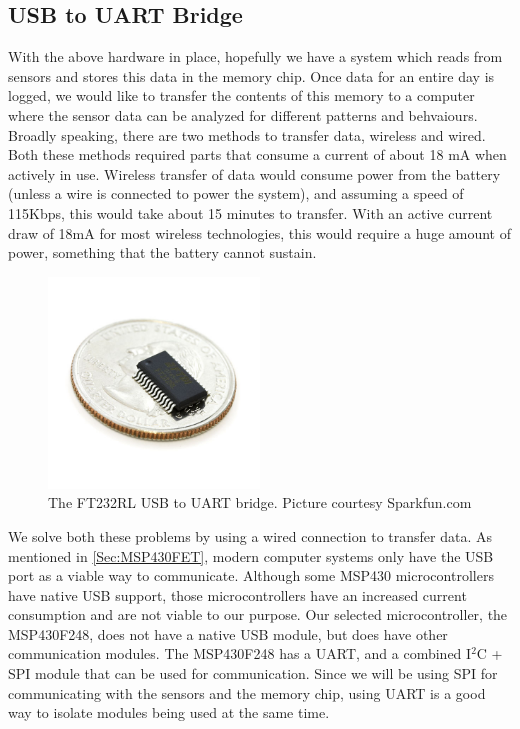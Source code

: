 \subsection{USB to UART Bridge}
\label{Sec:FT232}
With the above hardware in place, hopefully we have a system which reads from sensors and stores this data in the memory chip. Once data for an entire day is logged, we would like to transfer the contents of this memory to a computer where the sensor data can be analyzed for different patterns and behvaiours. Broadly speaking, there are two methods to transfer data, wireless and wired. Both these methods required parts that consume a current of about 18 mA when actively in use. Wireless transfer of data would consume power from the battery (unless a wire is connected to power the system), and assuming a speed of 115Kbps, this would take about 15 minutes to transfer. With an active current draw of 18mA for most wireless technologies, this would require a huge amount of power, something that the battery cannot sustain.
\begin{figure}
\begin{center}
\includegraphics[width=0.5\textwidth]{images/FT232coin.jpg}
\caption{The FT232RL USB to UART bridge. Picture courtesy Sparkfun.com}
\label{Fig:FT232}
\end{center}
\end{figure}

We solve both these problems by using a wired connection to transfer data. As mentioned in \ref{Sec:MSP430FET}, modern computer systems only have the USB port as a viable way to communicate. Although some MSP430 microcontrollers have native USB support, those microcontrollers have an increased current consumption and are not viable to our purpose. Our selected microcontroller, the MSP430F248, does not have a native USB module, but does have other communication modules. The MSP430F248 has a UART, and a combined I$^2$C + SPI module that can be used for communication. Since we will be using SPI for communicating with the sensors and the memory chip, using UART is a good way to isolate modules being used at the same time. 

